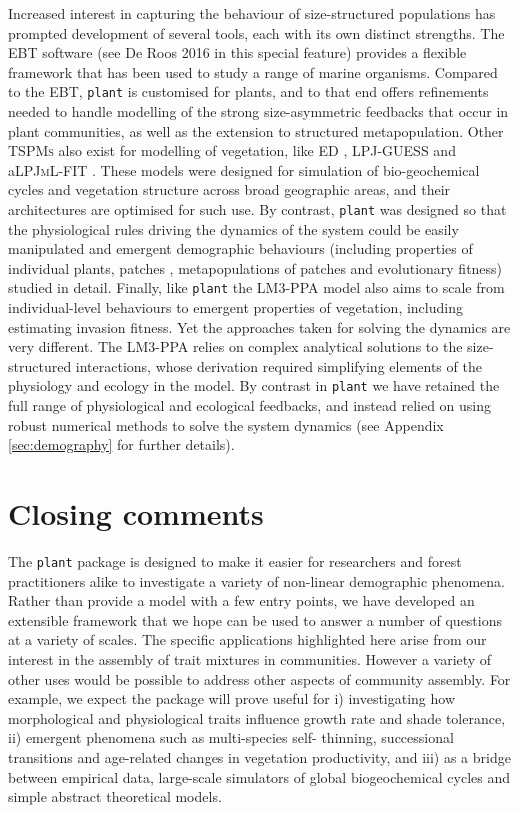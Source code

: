 \documentclass[a4paper,11pt]{article}
\newcommand{\plant}{\texttt{plant}}
\begin{document}
Increased interest in capturing the behaviour of size-structured  populations
has prompted development of several tools, each with its own distinct
strengths. The \textsc{EBT} software (see De Roos 2016 in this special feature) provides
a flexible framework that has been used to study a range of marine organisms.
Compared to the \textsc{EBT}, {\plant} is customised for plants, and
to that end offers refinements needed to handle modelling of the strong
size-asymmetric feedbacks that occur in plant communities, as well as the
extension to structured metapopulation. Other \textsc{TSPMs} also exist for modelling of vegetation, like \textsc{ED}
\citep[ver 1 and 2][]{Moorcroft-2001, Medvigy-2009}, \textsc {LPJ-GUESS}
\citep{Smith-2014} and a\textsc{LPJmL-FIT}  \citep{Sakschewski-2015}. These
models were designed for simulation of bio-geochemical cycles and vegetation
structure across broad geographic areas, and their architectures are
optimised for such use. By contrast, {\plant} was  designed so that the
physiological rules driving the dynamics of the system could be easily
manipulated and emergent demographic behaviours (including properties of individual plants, patches , metapopulations of patches and evolutionary fitness) studied in
detail. Finally, like {\plant} the \textsc{LM3-PPA} \cite{Weng-2015} model also aims
to scale from individual-level behaviours to emergent properties of
vegetation, including estimating invasion fitness. Yet the approaches taken
for solving the dynamics are very different. The \textsc{LM3-PPA} relies on
complex analytical solutions to the size- structured interactions, whose
derivation required simplifying elements of the physiology and ecology in the
model. By contrast in {\plant} we have retained the full range of
physiological and ecological feedbacks, and instead relied on using robust
numerical methods to solve the system dynamics (see Appendix
\ref{sec:demography} for further details).

\section{Closing comments}

The {\plant} package is designed to make it easier for researchers and forest
practitioners alike to investigate a variety of non-linear demographic
phenomena.  Rather than provide a model with a few entry points, we
have developed an extensible framework that we hope can be used to
answer a number of questions at a variety of scales. The specific
applications highlighted here arise from our interest in the assembly of
trait mixtures in communities. However a variety of other uses would
be possible to address other aspects of community assembly. For
example, we expect the package will prove useful for i) investigating
how morphological and physiological traits influence growth rate and
shade tolerance, ii) emergent phenomena such as multi-species self-
thinning, successional transitions and age-related changes in
vegetation productivity, and iii) as a bridge between empirical data,
large-scale simulators of global biogeochemical cycles and simple
abstract theoretical models.
\end{document}
